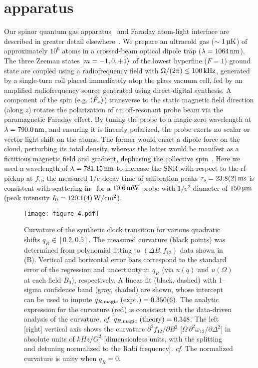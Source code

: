 \documentclass[aps,prl,reprint,superscriptaddress,floatfix]{revtex4-1}
\begin{document}
\section{apparatus}
\label{sec:apparatus}
Our spinor quantum gas apparatus~\cite{wood_magnetic_2015} and Faraday atom-light interface are described in greater detail elsewhere~\cite{jasperse_magic-wavelength_2017}.
We prepare an ultracold gas ($\sim \unit[1]{\upmu K}$) of approximately $10^6$ \Rb atoms in a crossed-beam optical dipole trap ($\lambda=\unit[1064]{nm}$).
The three Zeeman states $\vert m=-1,0,+1 \rangle $ of the lowest hyperfine ($F=1$) ground state are coupled using a radiofrequency field with $\Omega/(2\pi) \leq \unit[100]{kHz}$, generated by a single-turn coil placed immediately atop the glass vacuum cell, fed by an amplified radiofrequency source generated using direct-digital synthesis.
A component of the spin (e.g. $\langle \hat{F}_x \rangle$) transverse to the static magnetic field direction (along $z$) rotates the polarization of an off-resonant probe beam via the paramagnetic Faraday effect.
    By tuning the probe to a magic-zero wavelength at $\lambda = \unit[790.0]{nm}$, and ensuring it is linearly polarized, the probe exerts no scalar or vector light shift on the atoms.
The former would enact a dipole force on the cloud, perturbing its total density, whereas the latter would be manifest as a fictitious magnetic field and gradient, dephasing the collective spin~\cite{wood_measurement_2016}.
Here we used a wavelength of $\lambda=\unit[781.15]{nm}$ to increase the SNR with respect to the rf pickup at $f_{\text{rf}}$; the measured $1/e$ decay time of calibration peaks $\tau_s = \unit[23.8(2)]{ms}$ is consistent with scattering in~\cite{jasperse_magic-wavelength_2017} for a $\unit[10.6]{mW}$ probe with $1/e^2$ diameter of $\unit[150]{\upmu m}$ (peak intensity $I_0 = \unit[120.1(4)]{W/cm^2}$).


\begin{figure}
    \centering
    \texttt{[image: figure\_4.pdf]}
    \caption{
    \label{fig:curvature_vs_qR}
        Curvature of the synthetic clock transition for various quadratic shifts $q_R \in [0.2, 0.5]$.
        The measured curvature (black points) was determined from polynomial fitting to $(\Delta B, f_{12})$ data shown in (B).
        Vertical and horizontal error bars correspond to the standard error of the regression and uncertainty in $q_R$ (via $u(q)$ and $u(\Omega)$ at each field $B_0$), respectively.
        A linear fit (black, dashed) with 1--sigma confidence band (gray, shaded) are shown, whose intercept can be used to impute $q_{R,\text{magic}}\text{ (expt.)} = 0.350(6)$.
        The analytic expression for the curvature (red) is consistent with the data-driven analysis of the curvature, \textit{cf.} $q_{R,\text{magic}}\text{ (theory)} = 0.348$.
        The left [right] vertical axis shows the curvature $\partial^2 f_{12}/\partial B^2$ [$\Omega\, \partial^2\omega_{12}/\partial \Delta^2$] in absolute units of $\unit{kHz/G^2}$ [dimensionless units, with the splitting and detuning normalized to the Rabi frequency].
      \textit{cf.} The normalized curvature is unity when $q_R=0$.
    }
\end{figure}
\end{document}
